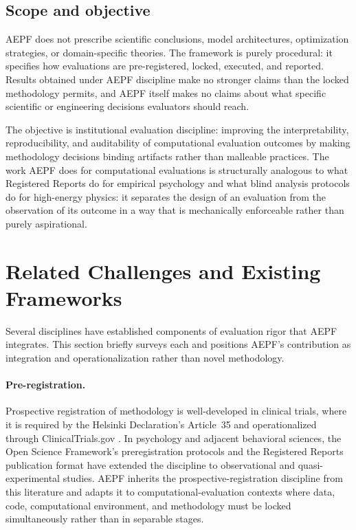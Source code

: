 \documentclass[11pt]{article}
\begin{document}
\subsection{Scope and objective}
\label{subsec:scope}

AEPF does not prescribe scientific conclusions, model architectures,
optimization strategies, or domain-specific theories. The framework
is purely procedural: it specifies how evaluations are
pre-registered, locked, executed, and reported. Results obtained
under AEPF discipline make no stronger claims than the locked
methodology permits, and AEPF itself makes no claims about what
specific scientific or engineering decisions evaluators should
reach.

The objective is institutional evaluation discipline: improving the
interpretability, reproducibility, and auditability of computational
evaluation outcomes by making methodology decisions binding
artifacts rather than malleable practices. The work AEPF does for
computational evaluations is structurally analogous to what
Registered Reports \cite{chambers2013registered} do for empirical
psychology and what blind analysis protocols \cite{klein2005blind}
do for high-energy physics: it separates the design of an
evaluation from the observation of its outcome in a way that is
mechanically enforceable rather than purely aspirational.

\section{Related Challenges and Existing Frameworks}
\label{sec:related}

Several disciplines have established components of evaluation rigor
that AEPF integrates. This section briefly surveys each and
positions AEPF's contribution as integration and operationalization
rather than novel methodology.

\paragraph{Pre-registration.}
Prospective registration of methodology is well-developed in
clinical trials, where it is required by the Helsinki Declaration's
Article~35 \cite{helsinki2013} and operationalized through
ClinicalTrials.gov \cite{zarin2011clinicaltrials}. In psychology
and adjacent behavioral sciences, the Open Science Framework's
preregistration protocols \cite{nosek2018preregistration} and the
Registered Reports publication format \cite{chambers2013registered}
have extended the discipline to observational and quasi-experimental
studies. AEPF inherits the prospective-registration discipline from
this literature and adapts it to computational-evaluation contexts
where data, code, computational environment, and methodology must
be locked simultaneously rather than in separable stages.
\end{document}
